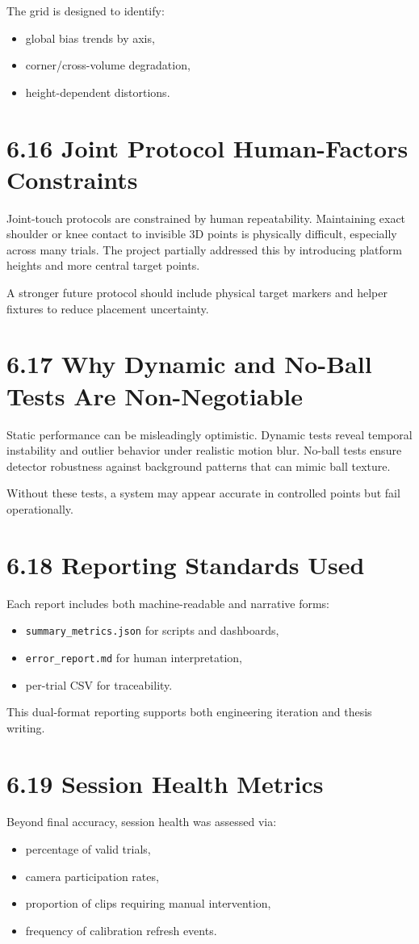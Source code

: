 The grid is designed to identify:
\begin{itemize}
  \item global bias trends by axis,
  \item corner/cross-volume degradation,
  \item height-dependent distortions.
\end{itemize}

\section{6.16 Joint Protocol Human-Factors Constraints}
Joint-touch protocols are constrained by human repeatability. Maintaining exact shoulder or knee contact to invisible 3D points is physically difficult, especially across many trials. The project partially addressed this by introducing platform heights and more central target points.

A stronger future protocol should include physical target markers and helper fixtures to reduce placement uncertainty.

\section{6.17 Why Dynamic and No-Ball Tests Are Non-Negotiable}
Static performance can be misleadingly optimistic. Dynamic tests reveal temporal instability and outlier behavior under realistic motion blur. No-ball tests ensure detector robustness against background patterns that can mimic ball texture.

Without these tests, a system may appear accurate in controlled points but fail operationally.

\section{6.18 Reporting Standards Used}
Each report includes both machine-readable and narrative forms:
\begin{itemize}
  \item \texttt{summary\_metrics.json} for scripts and dashboards,
  \item \texttt{error\_report.md} for human interpretation,
  \item per-trial CSV for traceability.
\end{itemize}

This dual-format reporting supports both engineering iteration and thesis writing.

\section{6.19 Session Health Metrics}
Beyond final accuracy, session health was assessed via:
\begin{itemize}
  \item percentage of valid trials,
  \item camera participation rates,
  \item proportion of clips requiring manual intervention,
  \item frequency of calibration refresh events.
\end{itemize}

